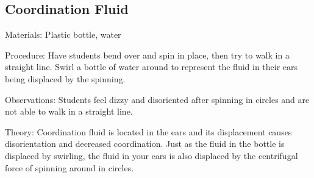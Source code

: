 \begin{multicols}{2}
\subsection{Coordination Fluid}


\begin{description*}
\item[Materials:]{Plastic bottle, water}
\item[Procedure:]{Have students bend over and spin in place, then try to walk in a straight line. Swirl a bottle of water around to represent the fluid in their ears being displaced by the spinning.}
\item[Observations:]{Students feel dizzy and disoriented after spinning in circles and are not able to walk in a straight line.}
\item[Theory:]{Coordination fluid is located in the ears and its displacement causes disorientation and decreased coordination. Just as the fluid in the bottle is displaced by swirling, the fluid in your ears is also displaced by the centrifugal force of spinning around in circles.}
\end{description*}

%
%


\end{multicols}
